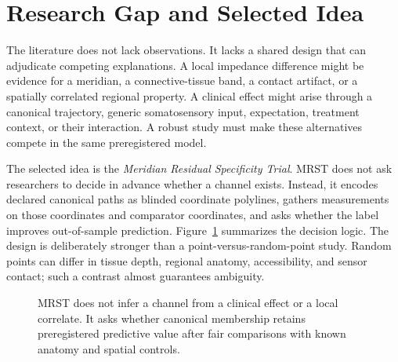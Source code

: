 \documentclass[conference]{IEEEtran}
\begin{document}
\section{Research Gap and Selected Idea}

The literature does not lack observations. It lacks a shared design that can adjudicate competing explanations. A local impedance difference might be evidence for a meridian, a connective-tissue band, a contact artifact, or a spatially correlated regional property. A clinical effect might arise through a canonical trajectory, generic somatosensory input, expectation, treatment context, or their interaction. A robust study must make these alternatives compete in the same preregistered model.

The selected idea is the \emph{Meridian Residual Specificity Trial}. MRST does not ask researchers to decide in advance whether a channel exists. Instead, it encodes declared canonical paths as blinded coordinate polylines, gathers measurements on those coordinates and comparator coordinates, and asks whether the label improves out-of-sample prediction. Figure~\ref{fig:logic} summarizes the decision logic. The design is deliberately stronger than a point-versus-random-point study. Random points can differ in tissue depth, regional anatomy, accessibility, and sensor contact; such a contrast almost guarantees ambiguity.

\begin{figure}[!t]
\centering
\setlength{\fboxsep}{7pt}
\caption{MRST does not infer a channel from a clinical effect or a local correlate. It asks whether canonical membership retains preregistered predictive value after fair comparisons with known anatomy and spatial controls.}
\label{fig:logic}
\end{figure}
\end{document}
